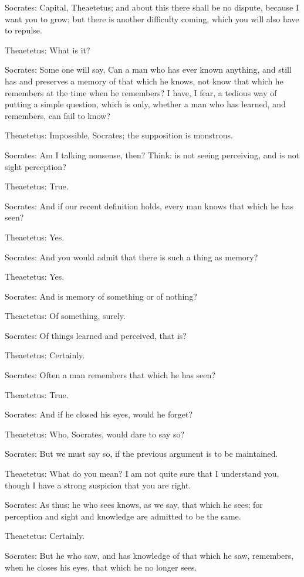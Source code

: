 Socrates: Capital, Theaetetus; and about this there shall be no dispute,
because I want you to grow; but there is another difficulty coming,
which you will also have to repulse.

Theaetetus: What is it?

Socrates: Some one will say, Can a man who has ever known anything, and
still has and preserves a memory of that which he knows, not know that
which he remembers at the time when he remembers? I have, I fear, a
tedious way of putting a simple question, which is only, whether a man
who has learned, and remembers, can fail to know?

Theaetetus: Impossible, Socrates; the supposition is monstrous.

Socrates: Am I talking nonsense, then? Think: is not seeing perceiving,
and is not sight perception?

Theaetetus: True.

Socrates: And if our recent definition holds, every man knows that which
he has seen?

Theaetetus: Yes.

Socrates: And you would admit that there is such a thing as memory?

Theaetetus: Yes.

Socrates: And is memory of something or of nothing?

Theaetetus: Of something, surely.

Socrates: Of things learned and perceived, that is?

Theaetetus: Certainly.

Socrates: Often a man remembers that which he has seen?

Theaetetus: True.

Socrates: And if he closed his eyes, would he forget?

Theaetetus: Who, Socrates, would dare to say so?

Socrates: But we must say so, if the previous argument is to be
maintained.

Theaetetus: What do you mean? I am not quite sure that I understand you,
though I have a strong suspicion that you are right.

Socrates: As thus: he who sees knows, as we say, that which he sees; for
perception and sight and knowledge are admitted to be the same.

Theaetetus: Certainly.

Socrates: But he who saw, and has knowledge of that which he saw,
remembers, when he closes his eyes, that which he no longer sees.

